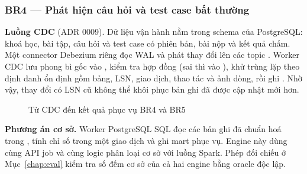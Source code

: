 \subsubsection{BR4 --- Phát hiện câu hỏi và test case bất thường}
\label{sec:br4-runtime}

\textbf{Luồng CDC} (ADR 0009). Dữ liệu vận hành nằm trong schema  của PostgreSQL: khoá học, bài tập, câu hỏi và test case có phiên bản, bài nộp và kết quả chấm. Một connector Debezium riêng đọc WAL và phát thay đổi lên các topic . Worker CDC lưu phong bì gốc vào , kiểm tra hợp đồng (sai thì vào ), khử trùng lặp theo định danh ổn định gồm bảng, LSN, giao dịch, thao tác và ảnh dòng, rồi ghi . Nhờ vậy, thay đổi có LSN cũ không thể khôi phục bản ghi đã được cập nhật mới hơn.

\begin{figure}[H]
\centering
{}
\caption{Từ CDC đến kết quả phục vụ BR4 và BR5}
\label{fig:br45}
\end{figure}

\textbf{Phương án cơ sở.} Worker PostgreSQL SQL đọc các bản ghi đã chuẩn hoá trong , tính chỉ số trong một giao dịch và ghi mart phục vụ. Engine này dùng cùng API job và cùng logic phân loại cơ sở với luồng Spark. Phép đối chiếu ở Mục~\ref{chap:eval} kiểm tra số đếm cơ sở của cả hai engine bằng oracle độc lập.

